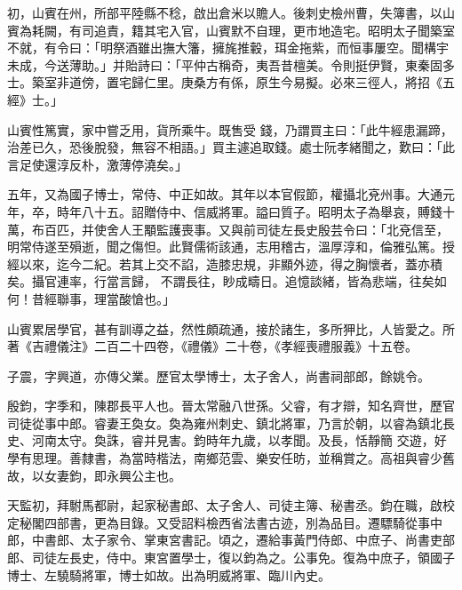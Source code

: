 \begin{pinyinscope}
 初，山賓在州，所部平陸縣不稔，啟出倉米以贍人。後刺史檢州曹，失簿書，以山賓為耗闕，有司追責，籍其宅入官，山賓默不自理，更市地造宅。昭明太子聞築室不就，有令曰：「明祭酒雖出撫大籓，擁旄推轂，珥金拖紫，而恒事屢空。聞構宇未成，今送薄助。」并貽詩曰：「平仲古稱奇，夷吾昔檀美。令則挺伊賢，東秦固多士。築室非道傍，置宅歸仁里。庚桑方有係，原生今易擬。必來三徑人，將招《五經》士。」



 山賓性篤實，家中嘗乏用，貨所乘牛。既售受
 錢，乃謂買主曰：「此牛經患漏蹄，治差已久，恐後脫發，無容不相語。」買主遽追取錢。處士阮孝緒聞之，歎曰：「此言足使還淳反朴，激薄停澆矣。」



 五年，又為國子博士，常侍、中正如故。其年以本官假節，權攝北兗州事。大通元年，卒，時年八十五。詔贈侍中、信威將軍。謚曰質子。昭明太子為舉哀，賻錢十萬，布百匹，并使舍人王顒監護喪事。又與前司徒左長史殷芸令曰：「北兗信至，明常侍遂至殞逝，聞之傷怛。此賢儒術該通，志用稽古，溫厚淳和，倫雅弘篤。授經以來，迄今二紀。若其上交不諂，造膝忠規，非顯外迹，得之胸懷者，蓋亦積矣。攝官連率，行當言歸，
 不謂長往，眇成疇日。追憶談緒，皆為悲端，往矣如何！昔經聯事，理當酸愴也。」



 山賓累居學官，甚有訓導之益，然性頗疏通，接於諸生，多所狎比，人皆愛之。所著《吉禮儀注》二百二十四卷，《禮儀》二十卷，《孝經喪禮服義》十五卷。



 子震，字興道，亦傳父業。歷官太學博士，太子舍人，尚書祠部郎，餘姚令。



 殷鈞，字季和，陳郡長平人也。晉太常融八世孫。父睿，有才辯，知名齊世，歷官司徒從事中郎。睿妻王奐女。奐為雍州刺史、鎮北將軍，乃言於朝，以睿為鎮北長史、河南太守。奐誅，睿并見害。鈞時年九歲，以孝聞。及長，恬靜簡
 交遊，好學有思理。善隸書，為當時楷法，南鄉范雲、樂安任昉，並稱賞之。高祖與睿少舊故，以女妻鈞，即永興公主也。



 天監初，拜駙馬都尉，起家秘書郎、太子舍人、司徒主簿、秘書丞。鈞在職，啟校定秘閣四部書，更為目錄。又受詔料檢西省法書古迹，別為品目。遷驃騎從事中郎，中書郎、太子家令、掌東宮書記。頃之，遷給事黃門侍郎、中庶子、尚書吏部郎、司徒左長史，侍中。東宮置學士，復以鈞為之。公事免。復為中庶子，領國子博士、左驍騎將軍，博士如故。出為明威將軍、臨川內史。




\end{pinyinscope}
